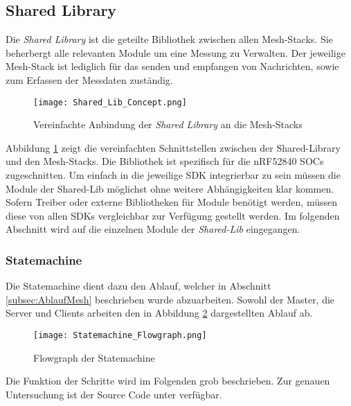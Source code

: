 



\subsection{Shared Library}\label{subsec:SharedLibrary}

Die \textit{Shared Library} ist die geteilte Bibliothek zwischen allen Mesh-Stacks. Sie beherbergt alle relevanten Module um eine Messung zu Verwalten. Der jeweilige Mesh-Stack ist lediglich für das senden und empfangen von Nachrichten, sowie zum Erfassen der Messdaten zuständig. 


\begin{figure}[H]
	\centering
	\texttt{[image: Shared\_Lib\_Concept.png]}
	\caption{Vereinfachte Anbindung der \textit{Shared Library} an die Mesh-Stacks}\label{fig:ShardeLibConcept}
\end{figure}

Abbildung \ref{fig:ShardeLibConcept} zeigt die vereinfachten Schnittstellen zwischen der Shared-Library und den Mesh-Stacks. Die Bibliothek ist spezifisch für die nRF52840 SOCs zugeschnitten. Um einfach in die jeweilige SDK integrierbar zu sein müssen die Module der Shared-Lib möglichst ohne weitere Abhängigkeiten klar kommen. Sofern Treiber oder externe Bibliotheken für Module benötigt werden, müssen diese von allen SDKs vergleichbar zur Verfügung gestellt werden. Im folgenden Abschnitt wird auf die einzelnen Module der \textit{Shared-Lib} eingegangen. 


\subsubsection{Statemachine}\label{subsubsec:StatemachineSoftware}

Die Statemachine dient dazu den Ablauf, welcher in Abschnitt \ref{subsec:AblaufMesh} beschrieben wurde abzuarbeiten. Sowohl der Master, die Server und Clients arbeiten den in Abbildung \ref{fig:StatemachineFLowgraph} dargestellten Ablauf ab. 

\begin{figure}[H]
	\centering
	\texttt{[image: Statemachine\_Flowgraph.png]}
	\caption{Flowgraph der Statemachine}\label{fig:StatemachineFLowgraph}
\end{figure}


Die Funktion der Schritte wird im Folgenden grob beschrieben. Zur genauen Untersuchung ist der Source Code unter \cite{rouben94_sharedlib_software_git_2020} verfügbar.  \\


